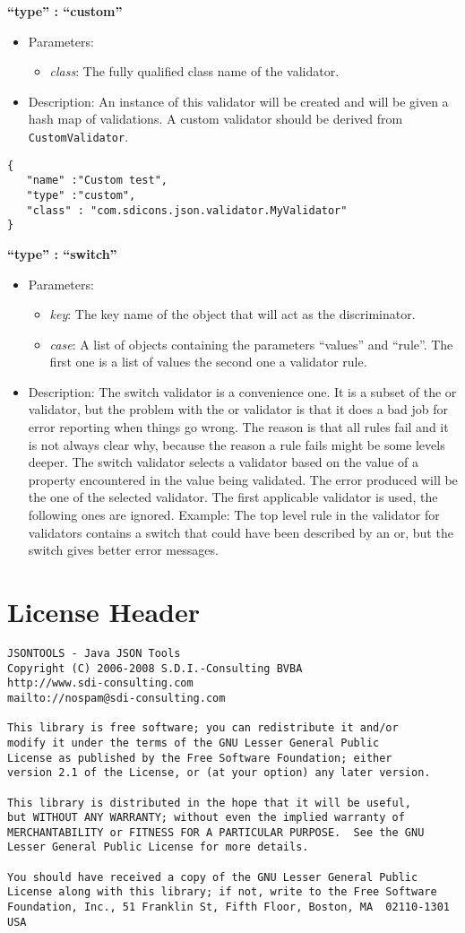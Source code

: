 \documentclass[a4paper]{article}
\newcommand{\ruledef}[3]{
\medskip
\textbf{#1}

\begin{itemize}
\setlength{\itemsep}{1pt}
\setlength{\parskip}{0pt}
\setlength{\parsep}{0pt}
   \item Parameters: #2
   \item Description: #3
\end{itemize}
}
\newcommand{\rulename}[1]{\textbf{``type'' : ``#1''}}
\newcommand{\param}[1]{\textsl{#1}:}
\begin{document}
\ruledef{\rulename{custom}}{\begin{itemize} \item \param{class} The fully qualified class name of the validator.\end{itemize}}{An instance of this validator will be created and will be given a hash map of validations.  A custom validator should be derived from \lstinline{CustomValidator}. }

\begin{lstlisting}
{
   "name" :"Custom test",
   "type" :"custom",
   "class" : "com.sdicons.json.validator.MyValidator"
}
\end{lstlisting}

\ruledef{\rulename{switch}}{\begin{itemize} \item \param{key} The key name of the object that will act as the discriminator. \item \param{case}  A list of objects containing the parameters ``values'' and ``rule''. The first one is a list of values the second one a validator rule. \end{itemize}}{ The switch validator is a convenience one. It is a subset of the or validator, but the problem with the or validator is that it does a bad job for error reporting when things go wrong. The reason is that all rules fail and it is not always clear why, because the reason a rule fails might be some levels deeper. The switch validator selects a validator based on the value of  a property encountered in the value being validated. The error produced will be the one of the selected validator.  The first applicable validator is used, the following ones are ignored.
Example: The top level rule in the validator for validators contains a switch that could have been described by an or, but the switch gives better error messages.}

\appendix

\newpage
\section{ License Header }
\label{license}

\begin{verbatim}
JSONTOOLS - Java JSON Tools
Copyright (C) 2006-2008 S.D.I.-Consulting BVBA
http://www.sdi-consulting.com
mailto://nospam@sdi-consulting.com

This library is free software; you can redistribute it and/or
modify it under the terms of the GNU Lesser General Public
License as published by the Free Software Foundation; either
version 2.1 of the License, or (at your option) any later version.

This library is distributed in the hope that it will be useful,
but WITHOUT ANY WARRANTY; without even the implied warranty of
MERCHANTABILITY or FITNESS FOR A PARTICULAR PURPOSE.  See the GNU
Lesser General Public License for more details.

You should have received a copy of the GNU Lesser General Public
License along with this library; if not, write to the Free Software
Foundation, Inc., 51 Franklin St, Fifth Floor, Boston, MA  02110-1301  USA 
\end{verbatim}
\end{document}
